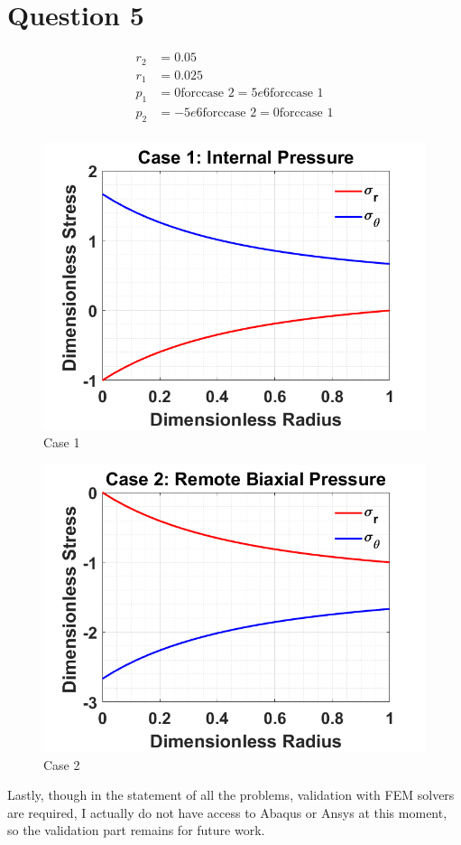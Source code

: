 \documentclass[12pt]{article} %
\begin{document}
\section*{Question 5}
\begin{align*}
    r_2 &= 0.05 \\
    r_1 &= 0.025 \\
    p_1 &= 0 \text{forccase 2} = 5e6 \text{forccase 1} \\
    p_2 &= -5e6 \text{forccase 2} = 0 \text{forccase 1} \\
\end{align*}
\begin{figure}[ht]
    \centering
    \includegraphics[width=1\textwidth]{case1.png}
    \caption{Case 1}
\end{figure}
\begin{figure}[ht]
    \centering
    \includegraphics[width=1\textwidth]{case2.png}
    \caption{Case 2}
\end{figure}

Lastly, though in the statement of all the problems, validation with FEM solvers are required, I actually do not have access to Abaqus or Ansys at this moment, so the validation part remains for future work.
\end{document}
